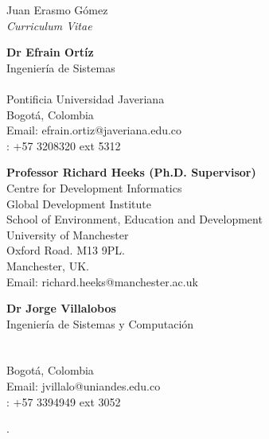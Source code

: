 \documentclass[10pt]{article}
\begin{document}
\begin{cv}{Juan Erasmo Gómez\\{\large \itshape Curriculum Vitae}}
  \begin{cvlist}{}
  \item \textbf{Dr Efrain Ortíz}\\
     Ingeniería de Sistemas \\
    \\
    Pontificia Universidad Javeriana\\
    Bogotá, Colombia\\
    Email: efrain.ortiz@javeriana.edu.co\\
    : +57 3208320 ext 5312
    
  \item \textbf{Professor Richard Heeks (Ph.D. Supervisor)}\\
    Centre for Development Informatics\\
    Global Development Institute\\
    School of Environment, Education and Development\\
    University of Manchester\\
    Oxford Road. M13 9PL.\\
    Manchester, UK.\\
    Email: richard.heeks@manchester.ac.uk
    
  \item \textbf{Dr Jorge Villalobos}\\
     Ingeniería de Sistemas y Computación \\
    \\
    \uniandes\\
    Bogotá, Colombia\\
    Email: jvillalo@uniandes.edu.co\\
    : +57 3394949 ext 3052
  \end{cvlist}

  \begin{cvlist}{}
  \item {}.
  \end{cvlist}
  

\end{cv}
\end{document}
